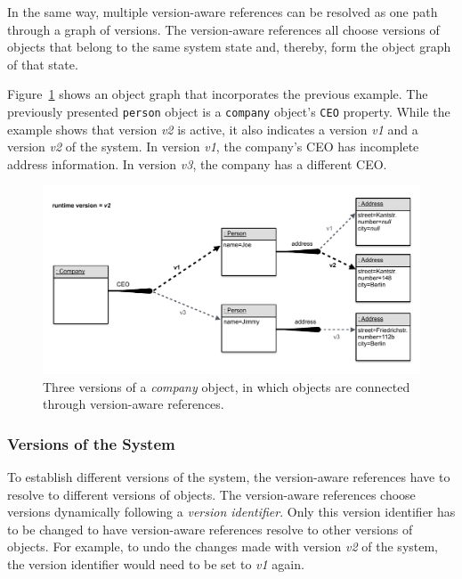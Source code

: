 In the same way, multiple version-aware references can be resolved as one path through a graph of versions.
The version-aware references all choose versions of objects that belong to the same system state and, thereby, form the object graph of that state.

Figure~\ref{fig:ObjectGraphWithReferencesResolvedAlongVersion2} shows an object graph that incorporates the previous example.
The previously presented \lstinline{person} object is a \lstinline{company} object's \lstinline{CEO} property.
While the example shows that version \emph{v2} is active, it also indicates a version \emph{v1} and a version \emph{v2} of the system.
In version \emph{v1}, the company's CEO has incomplete address information.
In version \emph{v3}, the company has a different CEO.

\begin{figure}[h]
    \centering
    \includegraphics[width=\textwidth]{figures/4_approach/6_objectGraphWithVersonAwareReferences.pdf}
    \caption{Three versions of a \emph{company} object, in which objects are connected through version-aware references.}
    \label{fig:ObjectGraphWithReferencesResolvedAlongVersion2}
\end{figure}


\subsubsection{Versions of the System}

To establish different versions of the system, the version-aware references have to resolve to different versions of objects.
The version-aware references choose versions dynamically following a \emph{version identifier}.
Only this version identifier has to be changed to have version-aware references resolve to other versions of objects.
For example, to undo the changes made with version \emph{v2} of the system, the version identifier would need to be set to \emph{v1} again.

